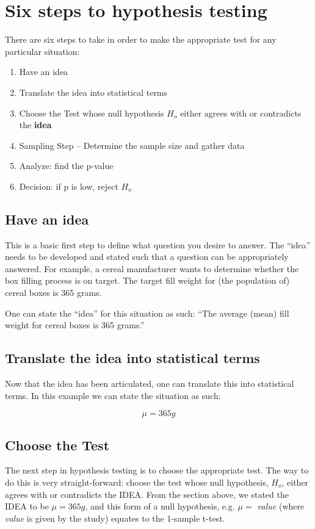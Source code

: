 \section{Six steps to hypothesis testing}
There are six steps to take in order to make the appropriate test for any particular situation:
\begin{enumerate}
\item Have an idea
\item Translate the idea into statistical terms
\item Choose the Test whose null hypothesis $ H_{o} $ either agrees with or contradicts the \textbf{idea}
\item Sampling Step -- Determine the sample size and gather data
\item Analyze: find the p-value 
\item Decision: if p is low, reject $ H_{o} $
\end{enumerate}

\subsection{Have an idea}

This is a basic first step to define what question you desire to answer.  The ``idea'' needs to be developed and stated such that a question can be appropriately answered.  For example, a cereal manufacturer wants to determine whether the box filling process is on target.  The target fill weight for (the population of) cereal boxes is 365 grams.

One can state the ``idea'' for this situation as such: ``The average (mean) fill weight for cereal boxes is 365 grams.''

\subsection{Translate the idea into statistical terms}

Now that the idea has been articulated, one can translate this into statistical terms. In this example we can state the situation as such:

\begin{center}
\begin{equation}
\mu = 365 g
\end{equation}
\end{center}


\subsection{Choose the Test}
The next step in hypothesis testing is to choose the appropriate test.  The way to do this is very straight-forward:  choose the test whose null hypothesis, $H_{o}$, either agrees with or contradicts the IDEA.  From the section above, we stated the IDEA to be $ \mu = 365 g $, and this form of a null hypothesis, e.g. $ \mu = $ \textit{value} (where \textit{value} is given by the study) equates to the 1-sample t-test.  

